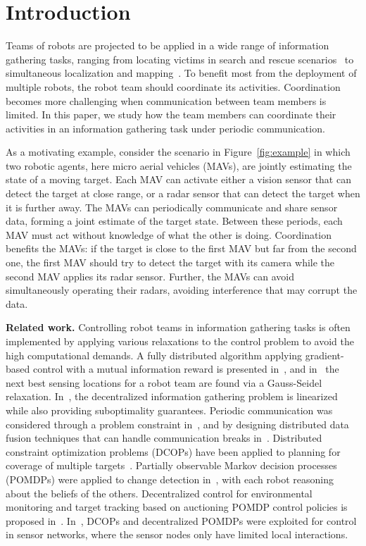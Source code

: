 \section{Introduction}
\label{sec:intro}
Teams of robots are projected to be applied in a wide range of information gathering tasks, ranging from locating victims in search and rescue scenarios~\cite{Balakirsky2007} to simultaneous localization and mapping~\cite{Saeedi2016}.
To benefit most from the deployment of multiple robots, the robot team should coordinate its activities.
Coordination becomes more challenging when communication between team members is limited.
In this paper, we study how the team members can coordinate their activities in an information gathering task under periodic communication.

As a motivating example, consider the scenario in Figure~\ref{fig:example} in which two robotic agents, here micro aerial vehicles (MAVs), are jointly estimating the state of a moving target.
Each MAV can activate either a vision sensor that can detect the target at close range, or a radar sensor that can detect the target when it is further away.
The MAVs can periodically communicate and share sensor data, forming a joint estimate of the target state.
Between these periods, each MAV must act without knowledge of what the other is doing.
Coordination benefits the MAVs: if the target is close to the first MAV but far from the second one, the first MAV should try to detect the target with its camera while the second MAV applies its radar sensor.
Further, the MAVs can avoid simultaneously operating their radars, avoiding  interference that may corrupt the data.

\textbf{Related work.}
Controlling robot teams in information gathering tasks is often implemented by applying various relaxations to the control problem to avoid the high computational demands.
A fully distributed algorithm applying gradient-based control with a mutual information reward is presented in~\cite{Julian2012}, and in~\cite{Zhou2011} the next best sensing locations for a robot team are found via a Gauss-Seidel relaxation.
In~\cite{Atanasov2015}, the decentralized information gathering problem is linearized while also providing suboptimality guarantees.
Periodic communication was considered through a problem constraint in~\cite{Hollinger2012}, and by designing distributed data fusion techniques that can handle communication breaks in~\cite{Hollinger2015}.
Distributed constraint optimization problems (DCOPs) have been applied to planning for coverage of multiple targets~\cite{Manish2009,Zivan2015}.
Partially observable Markov decision processes (POMDPs) were applied to change detection in~\cite{Renoux2015}, with each robot reasoning about the beliefs of the others.
Decentralized control for environmental monitoring and target tracking based on auctioning POMDP control policies is proposed in~\cite{Capitan2013}.
In~\cite{Nair2005}, DCOPs and decentralized POMDPs were exploited for control in sensor networks, where the sensor nodes only have limited local interactions. 

